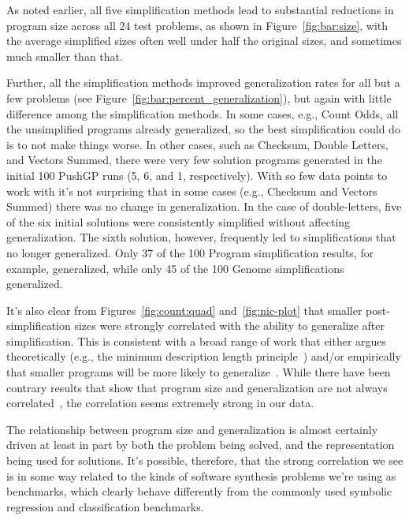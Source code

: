 As noted earlier, all five simplification methods lead to substantial
reductions in program size across all 24 test problems, as shown in
Figure~\ref{fig:bar:size}, with the average simplified sizes often 
well under half the original sizes, and sometimes much smaller than that.

Further, all the simplification methods improved generalization rates for
all but a few problems (see Figure~\ref{fig:bar:percent_generalization}),
but again with little difference among the simplification methods.
In some cases, e.g., Count Odds, all the unsimplified programs already
generalized, so the best simplification could do is to not make things
worse. In other cases, such as
Checksum, Double Letters, and Vectors Summed, there were very few 
solution programs generated in the initial 100 PushGP runs (5, 6, and 1,
respectively). With so few data points to work with it's not surprising
that in some cases (e.g., Checksum and Vectors Summed) there was no change
in generalization. In the case of double-letters, five of the six initial
solutions were consistently simplified without affecting generalization.
The sixth solution, however, frequently led to simplifications that no 
longer generalized. Only 37 of the 100 Program simplification results, 
for example, generalized, while only 45 of the 100 Genome simplifications
generalized.


It's also clear from Figures~\ref{fig:count:quad} and~\ref{fig:nic-plot} that
smaller post-simplification sizes were strongly correlated with the
ability to generalize after simplification. This is consistent with 
a broad range of work that either argues theoretically (e.g., the minimum
description length principle~\cite{iba1994genetic, zhang1995balancing}) 
and/or empirically
that smaller programs will be more likely to generalize~\cite{rosca:1996:gVsGP}.
While there have been contrary results that show that program size and
generalization are not always correlated~\cite{silva2012operator}, the
correlation seems extremely strong in our data. 

The relationship between
program size and generalization is almost certainly driven at least in part
by both the problem being solved, and the representation being used for
solutions. It's possible, therefore, that the strong correlation we see
is in some way related to the kinds of software synthesis problems we're using
as benchmarks, which clearly behave differently from the commonly used
symbolic regression and classification benchmarks. 

